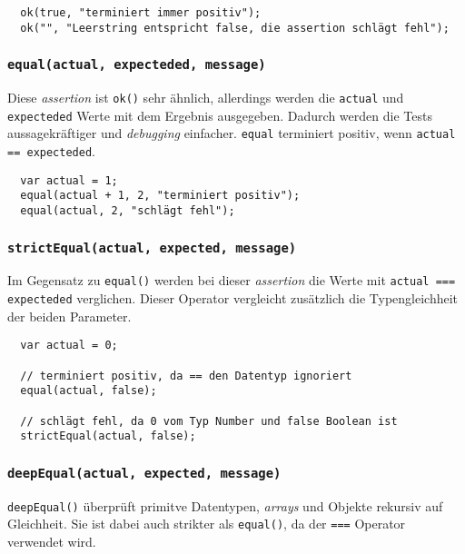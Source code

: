 \documentclass[11pt, a4paper]{article}
\begin{document}
\begin{verbatim}
  ok(true, "terminiert immer positiv");
  ok("", "Leerstring entspricht false, die assertion schlägt fehl");
\end{verbatim}

\subsubsection*{\texttt{equal(actual, expecteded, message)}}

Diese \emph{assertion} ist \texttt{ok()} sehr ähnlich, allerdings werden die
\texttt{actual} und \texttt{expecteded} Werte mit dem Ergebnis ausgegeben. Dadurch
werden die Tests aussagekräftiger und \emph{debugging} einfacher.
\texttt{equal} terminiert positiv, wenn \texttt{actual == expecteded}. 

\begin{verbatim}
  var actual = 1;
  equal(actual + 1, 2, "terminiert positiv");
  equal(actual, 2, "schlägt fehl");
\end{verbatim}

\subsubsection*{\texttt{strictEqual(actual, expected, message)}}

Im Gegensatz zu \texttt{equal()} werden bei dieser \emph{assertion} die Werte
mit \texttt{actual === expecteded} verglichen. Dieser Operator vergleicht
zusätzlich die Typengleichheit der beiden Parameter.

\begin{verbatim}
  var actual = 0;

  // terminiert positiv, da == den Datentyp ignoriert
  equal(actual, false);

  // schlägt fehl, da 0 vom Typ Number und false Boolean ist
  strictEqual(actual, false);
\end{verbatim}

\subsubsection*{\texttt{deepEqual(actual, expected, message)}}

\texttt{deepEqual()} überprüft primitve Datentypen, \emph{arrays} und Objekte
rekursiv auf Gleichheit. Sie ist dabei auch strikter als \texttt{equal()}, da
der \texttt{===} Operator verwendet wird.
\end{document}
